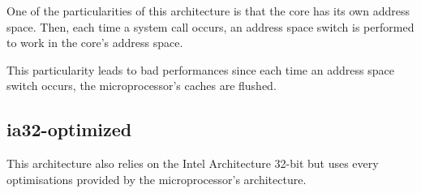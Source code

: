One of the particularities of this architecture is that the core has its
own address space. Then, each time a system call occurs, an address space
switch is performed to work in the core's address space.

This particularity leads to bad performances since each time an address
space switch occurs, the microprocessor's caches are flushed.

%
%

\subsection{ia32-optimized}

This architecture also relies on the Intel Architecture 32-bit but uses
every optimisations provided by the microprocessor's architecture.

